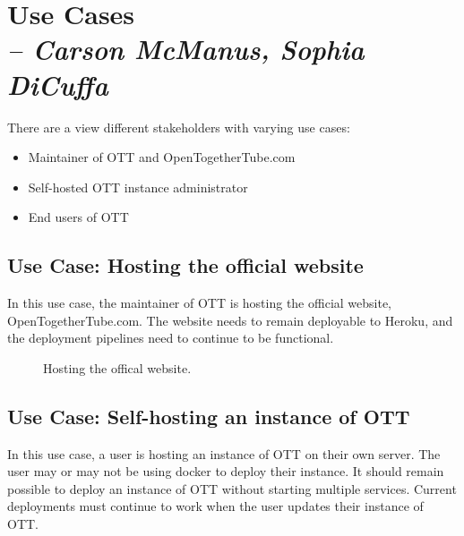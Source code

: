 \chapter{Use Cases \\
  \small{\textit{-- Carson McManus, Sophia DiCuffa}}
  \label{Chapter::UseCases}}

There are a view different stakeholders with varying use cases:

\begin{itemize}
	\item Maintainer of OTT and OpenTogetherTube.com
	\item Self-hosted OTT instance administrator
	\item End users of OTT
\end{itemize}

\section{Use Case: Hosting the official website}

In this use case, the maintainer of OTT is hosting the official website, OpenTogetherTube.com. The website needs to remain deployable to Heroku, and the deployment pipelines need to continue to be functional.

\begin{figure}[!htb]
  \centering
  \caption{\label{Figure::hosting-use-case} Hosting the offical website.}
\end{figure}

\section{Use Case: Self-hosting an instance of OTT}

In this use case, a user is hosting an instance of OTT on their own server. The user may or may not be using docker to deploy their instance. It should remain possible to deploy an instance of OTT without starting multiple services. Current deployments must continue to work when the user updates their instance of OTT.

